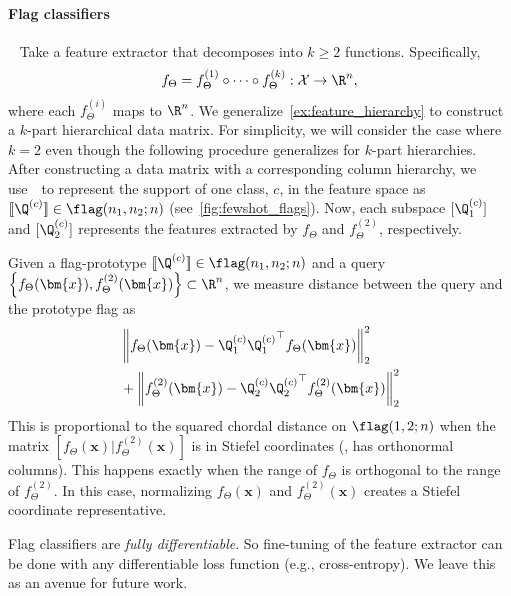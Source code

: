 \paragraph{Flag classifiers}~\label{sec:fewshot_flags} Take a feature extractor that decomposes into $k \geq 2$ functions. Specifically,
    \begin{equation}
        f_{\Theta} = f_{\Theta}^{(1)} \circ \cdots \circ f_{\Theta}^{(k)}:\mathcal{X} \rightarrow \R^n,
    \end{equation} 
    where each $f_{\Theta}^{(i)}$ maps to $\R^n$.
    We generalize~\cref{ex:feature_hierarchy} to construct a $k$-part hierarchical data matrix. For simplicity, we will consider the case where $k =2$ even though the following procedure generalizes for $k$-part hierarchies. After constructing a data matrix with a corresponding column hierarchy, we use~\algname~to represent the support of one class, $c$, in the feature space as $[\![\Q^{(c)}]\!]\in \flag(n_1,n_2; n)$ (see~\cref{fig:fewshot_flags}). Now, each subspace $[\Q^{(c)}_1]$ and $[\Q^{(c)}_2]$ represents the features extracted by $f_{\Theta}$ and $f_{\Theta}^{(2)}$, respectively.

    Given a flag-prototype $[\![\Q^{(c)}]\!] \in \flag(n_1,n_2;n)$ and a query $\left\{f_{\Theta}(\bm{x}), f^{(2)}_{\Theta}(\bm{x})\right\} \subset\R^n$, we measure distance between the query and the prototype flag as
    \begin{align}\label{eq: fewshot_dist}
        \begin{aligned}
        &\left \| f_{\Theta}(\bm{x}) - \Q^{(c)}_1 {\Q^{(c)}_1}^\top f_{\Theta}(\bm{x}) \right \|_2^2 \\
        &+ \left \| f_{\Theta}^{(2)}(\bm{x}) - \Q^{(c)}_2 {\Q^{(c)}_2}^\top f_{\Theta}^{(2)}(\bm{x}) \right \|_2^2
        \end{aligned}
    \end{align}
    This is proportional to the squared chordal distance on $\flag(1,2;n)$ when the matrix $[f_{\Theta}(\bm{x})| f^{(2)}_{\Theta}(\bm{x})]$ is in Stiefel coordinates (\eg, has orthonormal columns). This happens exactly when the range of $f_{\Theta}$ is orthogonal to the range of $f^{(2)}_{\Theta}$. In this case, normalizing $f_{\Theta}(\bm{x})$ and $f^{(2)}_{\Theta}(\bm{x})$ creates a Stiefel coordinate representative.

    Flag classifiers are \emph{fully differentiable}. So fine-tuning of the feature extractor can be done with any differentiable loss function (e.g., cross-entropy). We leave this as an avenue for future work.



